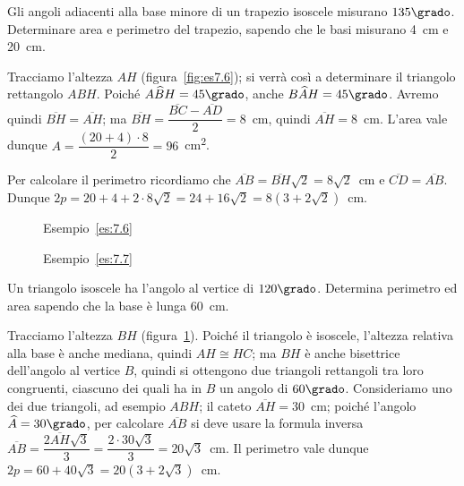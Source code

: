 \begin{exrig}
\begin{esempio}\label{es:7.6}
Gli angoli adiacenti alla base minore di un trapezio isoscele 
misurano $135\grado$. Determinare area e perimetro del trapezio, 
sapendo che le basi misurano 4~cm e 20~cm.\vspace{7pt}

Tracciamo l'altezza $AH$ (figura~\ref{fig:es7.6}); si verrà così a 
determinare il triangolo rettangolo $ABH$. Poiché 
$A\widehat{B}H=45\grado$, anche $B\widehat{A}H=45\grado$. Avremo 
quindi $\overline{BH}=\overline{AH}$; ma 
$\overline{BH}=\dfrac{\overline{BC}-\overline{AD}}{2}=8$~cm, quindi 
$\overline{AH}=8$~cm. L'area vale dunque $A=\dfrac{(20+4)\cdot 
8}{2}=96$~cm\textsuperscript{2}.

Per calcolare il perimetro ricordiamo che 
$\overline{AB}=\overline{BH}\sqrt{2}=8\sqrt{2}$~cm e 
$\overline{CD}=\overline{AB}$.
Dunque $2p=20+4+2\cdot 8\sqrt{2}=24+16\sqrt{2}=8(3+2\sqrt{2})$~cm.
\end{esempio}


\begin{inaccessibleblock}
 \begin{figure}[!htb]
	\begin{center}
		\begin{minipage}{0.45\textwidth}
			\centering
			
			
\caption{Esempio~\ref{es:7.6}}\label{fig:es7.6}
		\end{minipage}
		\hspace{0.03\textwidth}	
		\begin{minipage}{0.45\textwidth}
			\centering
			
			
\caption{Esempio~\ref{es:7.7}}\label{fig:es7.7}
		\end{minipage}
	\end{center}
\end{figure}
\end{inaccessibleblock}

\begin{esempio}\label{es:7.7}
Un triangolo isoscele ha l'angolo al vertice di $120\grado$. 
Determina perimetro ed area sapendo che la base è lunga 
60~cm.\vspace{7pt}

Tracciamo l'altezza $BH$ (figura~\ref{fig:es7.7}). Poiché il 
triangolo è isoscele, l'altezza relativa alla base è anche mediana, 
quindi $AH\cong HC$; ma $BH$ è anche bisettrice dell'angolo al vertice 
$B$, quindi si ottengono due triangoli rettangoli tra loro 
congruenti, ciascuno dei quali ha in $B$ un angolo di $60\grado$. 
Consideriamo uno dei due triangoli, ad esempio $ABH$; il cateto 
$\overline{AH}=30$~cm; poiché l'angolo $\widehat{A}=30\grado$, per 
calcolare $\overline{AB}$ si deve usare la formula inversa 
$\overline{AB}=\dfrac{2\overline{AH}\sqrt{3}}{3}=\dfrac{2\cdot 
30\sqrt{3}}{3}=20\sqrt{3}$~cm.
Il perimetro vale dunque $2p=60 + 40\sqrt{3} = 20 (3 + 2\sqrt{3})$~cm.


\end{esempio}
\end{exrig}
